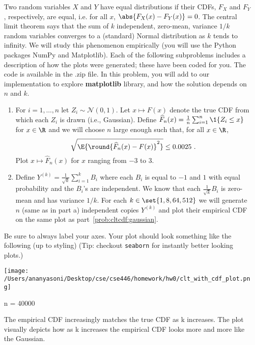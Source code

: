 \documentclass{article}
\begin{document}
\begin{aprob}
    Two random variables $X$ and $Y$ have equal  distributions if their CDFs, $F_X$ and $F_Y$, respectively, are equal, i.e. for all $x$, $ \abs{F_X(x) - F_Y(x)} = 0$. 
    The central limit theorem says that the sum of $k$ independent, zero-mean, variance $1/k$ random variables converges to a (standard) Normal distribution as $k$ tends to infinity.  
    We will study this phenomenon empirically (you will use the Python packages NumPy and Matplotlib).  Each of the following subproblems includes a description of how the plots were generated; these have been coded for you. The code is available in the .zip file. In this problem, you will add to our implementation to explore {\bf matplotlib} library, and how the solution depends on $n$ and $k$.
    
    \begin{enumerate}
    \item {}  \label{prob:cltcdf:gaussian} For $i=1,\ldots,n$ let $Z_i \sim \mathcal{N}(0,1)$. Let $x\mapsto F(x)$ denote the true CDF from which each $Z_i$ is drawn (i.e.,  Gaussian). Define  $\widehat{F}_n(x) = \frac{1}{n} \sum_{i=1}^n \1\{ Z_i \leq x\}$ for $x\in\R$ and we will choose $n$ large enough such that, for all $x \in \R$,
    \[
    	\sqrt{\E{\round{\widehat{F}_n(x)-F(x)}^2 }} \leq 0.0025\ .
    \]
    Plot $x\mapsto \widehat{F}_n(x)$ for $x$ ranging from $-3$ to $3$.
    
    \item  {}  Define $Y^{(k)} = \frac{1}{\sqrt{k}} \sum_{i=1}^k B_i$ where each $B_i$ is equal to $-1$ and $1$ with equal probability and the $B_i$'s are independent.
    We know that each $\frac{1}{\sqrt{k}} B_i$ is zero-mean and has variance $1/k$. \label{prob:cltcdf:k} For each $k \in \set{1, 8, 64, 512}$ we will generate $n$ (same as in part a) independent copies $Y^{(k)}$ and plot their empirical CDF on the same plot as part~\ref{prob:cltcdf:gaussian}.
    \end{enumerate}
    Be sure to always label your axes. 
    Your plot should look something like the following (up to styling) (Tip: checkout \texttt{seaborn} for instantly better looking plots.)
    \begin{tcolorbox}[colback=lightgray!10!white, colframe=black, title=A10]
        \begin{center}
            \texttt{[image: /Users/ananyasoni/Desktop/cse/cse446/homework/hw0/clt\_with\_cdf\_plot.png]}
        \end{center}
        n = 40000

        The empirical CDF increasingly matches the true CDF as k increases.
        The plot visually depicts how as k increases the empirical CDF looks
        more and more like the Gaussian.
    \end{tcolorbox}
\end{aprob}
\end{document}
